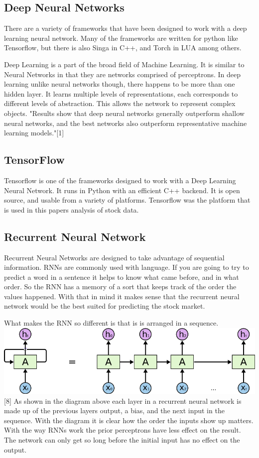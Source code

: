 \documentclass{article}
\begin{document}
\subsection{Deep Neural Networks}
There are a variety of frameworks that have been designed to work with a deep learning neural network. 
Many of the frameworks are written for python like Tensorflow, but there is also Singa in C++, and Torch in LUA among others.

Deep Learning is a part of the broad field of Machine Learning. 
It is similar to Neural Networks in that they are networks comprised of perceptrons.
In deep learning unlike neural networks though, there happens to be more than one hidden layer.
It learns multiple levels of representations, each corresponds to different levels of abstraction.
This allows the network to represent complex objects.
"Results show that deep neural networks
generally outperform shallow neural networks, and the best networks also outperform representative machine learning models."[1]


\subsection{TensorFlow}
Tensorflow is one of the frameworks designed to work with a Deep Learning Neural Network.
It runs in Python with an efficient C++ backend. 
It is open source, and usable from a variety of platforms. 
Tensorflow was the platform that is used in this papers analysis of stock data.

\subsection{Recurrent Neural Network}
Recurrent Neural Networks are designed to take advantage of sequential information.
RNNs are commonly used with language.
If you are going to try to predict a word in a sentence it helps to know what came before, and in what order.
So the RNN has a memory of a sort that keeps track of the order the values happened.
With that in mind it makes sense that the recurrent neural network would be the best suited for predicting the stock market.

What makes the RNN so different is that is is arranged in a sequence. \\


\includegraphics[width=\textwidth]{0_WdbXF_e8kZI1R5nQ.png}[8]
As shown in the diagram above each layer in a recurrent neural network is made up of the previous layers output, a bias, and the next input in the sequence.
With the diagram it is clear how the order the inputs show up matters.
With the way RNNs work the prior perceptrons have less effect on the result.
The network can only get so long before the initial input has no effect on the output.
\end{document}
